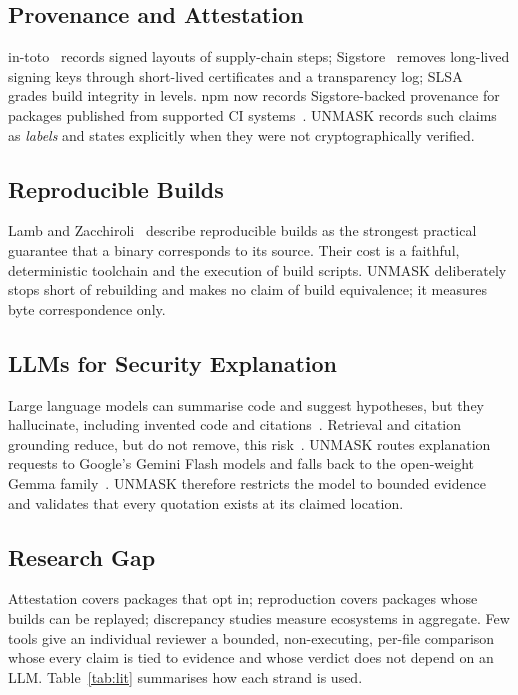\documentclass[conference]{IEEEtran}
\begin{document}
\subsection{Provenance and Attestation}
in-toto~\cite{intoto} records signed layouts of supply-chain steps; Sigstore~\cite{sigstore}
removes long-lived signing keys through short-lived certificates and a
transparency log; SLSA~\cite{slsa} grades build integrity in levels. npm now
records Sigstore-backed provenance for packages published from supported CI
systems~\cite{npmprov}. UNMASK records such claims as \emph{labels} and states
explicitly when they were not cryptographically verified.

\subsection{Reproducible Builds}
Lamb and Zacchiroli~\cite{lamb2021} describe reproducible builds as the
strongest practical guarantee that a binary corresponds to its source. Their
cost is a faithful, deterministic toolchain and the execution of build scripts.
UNMASK deliberately stops short of rebuilding and makes no claim of build
equivalence; it measures byte correspondence only.

\subsection{LLMs for Security Explanation}
Large language models can summarise code and suggest hypotheses, but they
hallucinate, including invented code and citations~\cite{ji2023}. Retrieval and
citation grounding reduce, but do not remove, this risk~\cite{gao2023}. UNMASK routes
explanation requests to Google's Gemini Flash models and falls back to the
open-weight Gemma family~\cite{gemma}. UNMASK therefore restricts the model to bounded evidence and
validates that every quotation exists at its claimed location.

\subsection{Research Gap}
Attestation covers packages that opt in; reproduction covers packages whose
builds can be replayed; discrepancy studies measure ecosystems in aggregate.
Few tools give an individual reviewer a bounded, non-executing, per-file
comparison whose every claim is tied to evidence and whose verdict does not
depend on an LLM. Table~\ref{tab:lit} summarises how each strand is used.
\end{document}
